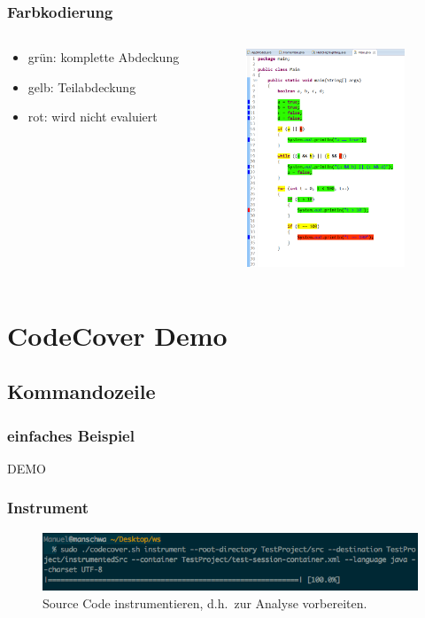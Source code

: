\documentclass{beamer}
\begin{document}
  \begin{frame}\frametitle{Farbkodierung}
    \begin{columns}
      \begin{column}{5cm}
        \begin{itemize}
          \item grün: komplette Abdeckung
          \item gelb: Teilabdeckung
          \item rot: wird nicht evaluiert
        \end{itemize}
        \vspace{1cm}
      \end{column}
      \begin{column}{5cm}
        \begin{overprint}
          \includegraphics[height=65mm]{pictures/farben.png}
        \end{overprint}
      \end{column}
    \end{columns}
  \end{frame}


  \section{CodeCover Demo}
  \subsection{Kommandozeile}
  \begin{frame}\frametitle{einfaches Beispiel}
    \centering \Huge{DEMO}\\
  \end{frame}

	\begin{frame}\frametitle{Instrument}
    \begin{figure}%
			\includegraphics[width=\columnwidth]{pictures/demo_commandline/01_instrument.png}%
			\caption{Source Code instrumentieren, d.h.\ zur Analyse vorbereiten.}%
			\label{}%
		\end{figure}
  \end{frame}
  
\end{document}
